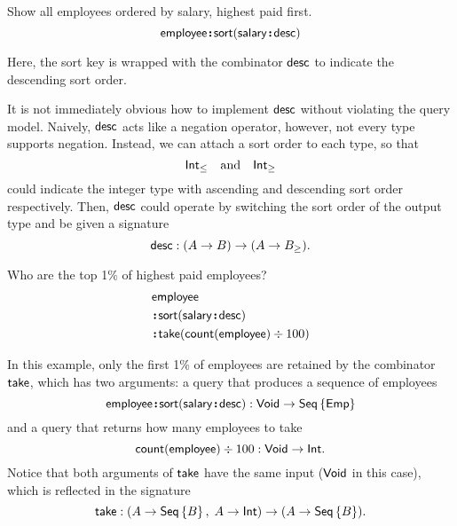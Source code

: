 \begin{demo}
    \label{ex:sort-employee-by-salary-desc}
    Show all employees ordered by salary, highest paid first.
    \begin{equation*}
        \textup{\textsf{employee}}\!\boldsymbol{:}\!\textup{\textsf{sort}}(\textup{\textsf{salary}}\!\boldsymbol{:}\!\textup{\textsf{desc}})
    \end{equation*}
\end{demo}

Here, the sort key is wrapped with the combinator $\textup{\textsf{desc}}$ to indicate the
descending sort order.

It is not immediately obvious how to implement $\textup{\textsf{desc}}$ without violating the
query model.  Naively, $\textup{\textsf{desc}}$ acts like a negation operator, however, not
every type supports negation.  Instead, we can attach a sort order to each
type, so that
\begin{equation*}
    \textup{\textsf{Int}}_{\le} \quad\text{and}\quad \textup{\textsf{Int}}_{\ge}
\end{equation*}
could indicate the integer type with ascending and descending sort order
respectively.  Then, $\textup{\textsf{desc}}$ could operate by switching the sort order of the
output type and be given a signature
\begin{equation*}
    \textup{\textsf{desc}} : (A \to B) \to (A \to B_{\ge}).
\end{equation*}

\begin{demo}
    \label{ex:sort-employee-by-salary-take-top}
    Who are the top 1\% of highest paid employees?
    \begin{align*}
        & \textup{\textsf{employee}} \\
        & \!\boldsymbol{:}\!\textup{\textsf{sort}}(\textup{\textsf{salary}}\!\boldsymbol{:}\!\textup{\textsf{desc}}) \\
        & \!\boldsymbol{:}\!\textup{\textsf{take}}(\textup{\textsf{count}}(\textup{\textsf{employee}})\mathbin \div 100)
    \end{align*}
\end{demo}

In this example, only the first 1\% of employees are retained by the combinator
$\textup{\textsf{take}}$, which has two arguments: a query that produces a sequence of employees
\begin{equation*}
    \textup{\textsf{employee}}\!\boldsymbol{:}\!\textup{\textsf{sort}}(\textup{\textsf{salary}}\!\boldsymbol{:}\!\textup{\textsf{desc}}) : \textup{\textsf{Void}} \to \textup{\textsf{Seq}}\left\{\textup{\textsf{Emp}}\right\}
\end{equation*}
and a query that returns how many employees to take
\begin{equation*}
    \textup{\textsf{count}}(\textup{\textsf{employee}}) \div 100 : \textup{\textsf{Void}} \to \textup{\textsf{Int}}.
\end{equation*}
Notice that both arguments of $\textup{\textsf{take}}$ have the same input ($\textup{\textsf{Void}}$ in this
case), which is reflected in the signature
\begin{equation*}
    \textup{\textsf{take}} : (A \to \textup{\textsf{Seq}}\left\{B\right\},\; A \to \textup{\textsf{Int}}) \to (A \to \textup{\textsf{Seq}}\left\{B\right\}).
\end{equation*}

